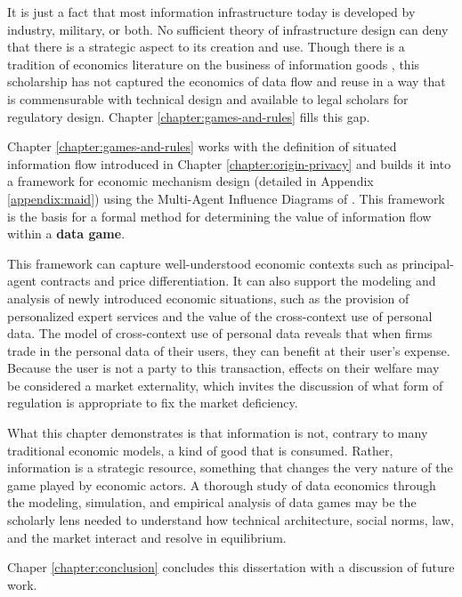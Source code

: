 \documentclass[../thesis.tex]{subfiles}
\begin{document}
 It is just a fact that most information infrastructure
 today is developed by industry, military, or both.
 No sufficient theory of infrastructure design can
 deny that there is a strategic aspect to its
 creation and use.
 Though there is a tradition of economics literature
 on the business of information goods
\cite{shapiro1998information}
\cite{varian2001economics} \cite{acquisti2016economics},
this scholarship has not captured the economics of data flow
and reuse
in a way that is commensurable with technical design and
available to legal scholars for regulatory design.
Chapter \ref{chapter:games-and-rules} fills this gap.

 Chapter \ref{chapter:games-and-rules} works with the
 definition of situated information flow introduced in
 Chapter \ref{chapter:origin-privacy} and builds
 it into a framework for economic mechanism design
 (detailed in Appendix \ref{appendix:maid})
 using the Multi-Agent Influence Diagrams
 of \citet{koller2003multi}.
 This framework is the basis for a formal method for
 determining the value of information flow within a
 \textbf{data game}.

 This framework can capture well-understood economic
 contexts such as principal-agent contracts and
 price differentiation.
 It can also support the modeling and analysis of
 newly introduced economic situations, such as the provision
 of personalized expert services and the
 value of the cross-context use of personal data.
 The model of cross-context use of personal data
 reveals that when firms trade in the personal data
 of their users, they can benefit at their user's expense.
 Because the user is not a party to this transaction,
 effects on their welfare may be considered a market externality,
 which invites the discussion of what form of
 regulation is appropriate to fix the market deficiency.

 What this chapter demonstrates is that information
 is not, contrary to many traditional economic models,
 a kind of good that is consumed.
 Rather, information is a strategic resource, something
 that changes the very nature of the game played by
 economic actors.
 A thorough study of data economics through the
 modeling, simulation, and empirical analysis of
 data games may be the scholarly lens needed to
 understand how technical architecture, social norms,
 law, and the market interact and resolve in equilibrium.

 Chaper \ref{chapter:conclusion} concludes this dissertation
 with a discussion of future work.
 
\end{document}

